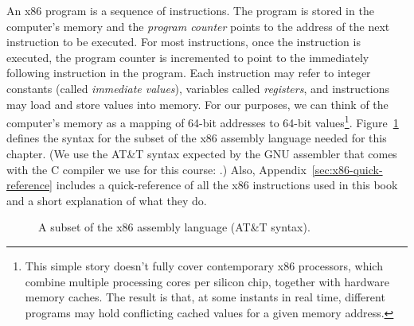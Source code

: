 \documentclass[11pt]{book}
\begin{document}
An x86 program is a sequence of instructions. The program is stored in the
computer's memory and the \emph{program counter} points to the address of the
next instruction to be executed. For most instructions, once the instruction is
executed, the program counter is incremented to point to the immediately
following instruction in the program.  Each instruction may refer to integer
constants (called \emph{immediate values}), variables called \emph{registers},
and instructions may load and store values into memory.  For our purposes, we
can think of the computer's memory as a mapping of 64-bit addresses to 64-bit
%
values\footnote{This simple story doesn't fully cover contemporary x86
  processors, which combine multiple processing cores per silicon chip, together
  with hardware memory caches.  The result is that, at some instants in real
  time, different programs may hold conflicting cached values for a given memory
  address.}.
%
Figure~\ref{fig:x86-a} defines the syntax for the
subset of the x86 assembly language needed for this chapter.
%
(We use the AT\&T syntax expected by the GNU assembler that comes with the C
compiler we use for this course: .)
%
Also, Appendix~\ref{sec:x86-quick-reference} includes a quick-reference of all
the x86 instructions used in this book and a short explanation of what they do.



\newcommand{\allregisters}{\key{rsp} \mid \key{rbp} \mid \key{rax} \mid \key{rbx} \mid \key{rcx}
              \mid \key{rdx} \mid \key{rsi} \mid \key{rdi} \mid \\
              && \key{r8} \mid \key{r9} \mid \key{r10}
              \mid \key{r11} \mid \key{r12} \mid \key{r13}
              \mid \key{r14} \mid \key{r15}}

\begin{figure}[tp]
\fbox{
\begin{minipage}{0.96\textwidth}
\[
\begin{array}{lcl}
\Reg &::=& \allregisters{} \\
\Arg &::=&  \key{\$}\Int \mid \key{\%}\Reg \mid \Int(\key{\%}\Reg) \\
\Instr &::=& \key{addq} \; \Arg, \Arg \mid
      \key{subq} \; \Arg, \Arg \mid
      \key{negq} \; \Arg \mid \key{movq} \; \Arg, \Arg \mid \\
  &&  \key{callq} \; \mathit{label} \mid
      \key{pushq}\;\Arg \mid \key{popq}\;\Arg \mid \key{retq} \\
\Prog &::= & \key{.globl main}\\
      &    & \key{main:} \; \Instr^{+}
\end{array}
\]
\end{minipage}
}
\caption{A subset of the x86 assembly language (AT\&T syntax).}
\label{fig:x86-a}
\end{figure}
\end{document}
